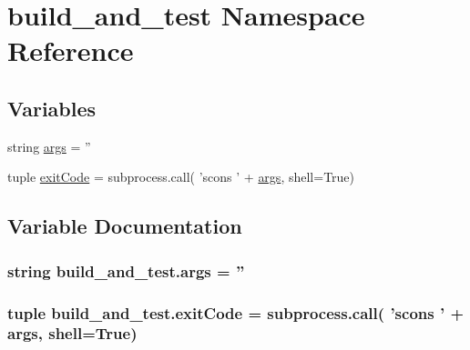 \hypertarget{namespacebuild__and__test}{\section{build\-\_\-and\-\_\-test Namespace Reference}
\label{namespacebuild__and__test}
}
\subsection*{Variables}
\begin{DoxyCompactItemize}
\item 
string \hyperlink{namespacebuild__and__test_accfd0c261f01d5f5dfd69cbde337d062}{args} = ''
\item 
tuple \hyperlink{namespacebuild__and__test_a7b97305f16cb81e939d7e112816eb9f1}{exit\-Code} = subprocess.\-call( 'scons ' + \hyperlink{namespacebuild__and__test_accfd0c261f01d5f5dfd69cbde337d062}{args}, shell=True)
\end{DoxyCompactItemize}


\subsection{Variable Documentation}
\hypertarget{namespacebuild__and__test_accfd0c261f01d5f5dfd69cbde337d062}{
\subsubsection[{args}]{\setlength{\rightskip}{0pt plus 5cm}string build\-\_\-and\-\_\-test.\-args = ''}}\label{namespacebuild__and__test_accfd0c261f01d5f5dfd69cbde337d062}
\hypertarget{namespacebuild__and__test_a7b97305f16cb81e939d7e112816eb9f1}{
\subsubsection[{exit\-Code}]{\setlength{\rightskip}{0pt plus 5cm}tuple build\-\_\-and\-\_\-test.\-exit\-Code = subprocess.\-call( 'scons ' + {\bf args}, shell=True)}}\label{namespacebuild__and__test_a7b97305f16cb81e939d7e112816eb9f1}
